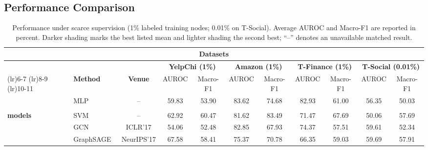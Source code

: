 \documentclass[10pt,journal]{IEEEtran}
\begin{document}
\subsection{Performance Comparison}
\label{sec:performance}
\begin{table}[!t]
\centering
\caption{Performance under scarce supervision (1\% labeled training nodes;
0.01\% on T-Social). Average AUROC and Macro-F1 are reported in percent. Darker shading marks the best listed mean and lighter shading the second best;
``--'' denotes an unavailable matched result.}
\label{tab:scarce}

\fontsize{7.2}{8.2}\selectfont
\setlength{\tabcolsep}{4.6pt}
\renewcommand{\arraystretch}{1.08}
\setlength{\aboverulesep}{0pt}
\setlength{\belowrulesep}{0pt}
\setlength{\extrarowheight}{1.15pt}
\renewcommand{\multirowsetup}{\centering}

\begin{tabular}{
>{\centering\arraybackslash}m{1.78cm}
l
c
*{8}{c}
}
\toprule

\multicolumn{3}{c}{} &
\multicolumn{8}{c}{\textbf{Datasets}} \\
\cmidrule(lr){4-11}

& & &
\multicolumn{2}{c}{\textbf{YelpChi (1\%)}} &
\multicolumn{2}{c}{\textbf{Amazon (1\%)}} &
\multicolumn{2}{c}{\textbf{T-Finance (1\%)}} &
\multicolumn{2}{c}{\textbf{T-Social (0.01\%)}} \\
\cmidrule(lr){4-5}
\cmidrule(lr){6-7}
\cmidrule(lr){8-9}
\cmidrule(lr){10-11}

\multirow{-2}{=}{\textbf{Category}} &
\multirow{-2}{*}{\textbf{Method}} &
\multirow{-2}{*}{\textbf{Venue}} &
AUROC & Macro-F1 &
AUROC & Macro-F1 &
AUROC & Macro-F1 &
AUROC & Macro-F1 \\
\midrule

& MLP~\cite{rumelhart1986learning} & -- &
59.83 & 53.90 &
83.62 & 74.68 &
82.93 & 61.00 &
56.35 & 50.03 \\
\multirow{-2}{=}{\makecell[c]{\textbf{Non-graph}\\\textbf{models}}}
& SVM~\cite{cortes1995support} & -- &
62.92 & 60.47 &
81.62 & 83.49 &
71.47 & 67.69 &
50.06 & 57.69 \\

\midrule

& GCN~\cite{kipf2017gcn} & ICLR'17 &
54.06 & 52.48 &
82.85 & 67.93 &
74.37 & 57.51 &
59.61 & 52.34 \\

& GraphSAGE~\cite{hamilton2017graphsage} & NeurIPS'17 &
67.58 & 58.41 &
75.37 & 70.78 &
66.35 & 59.03 &
59.69 & 57.91 \\


\end{tabular}
\end{table}
\end{document}

